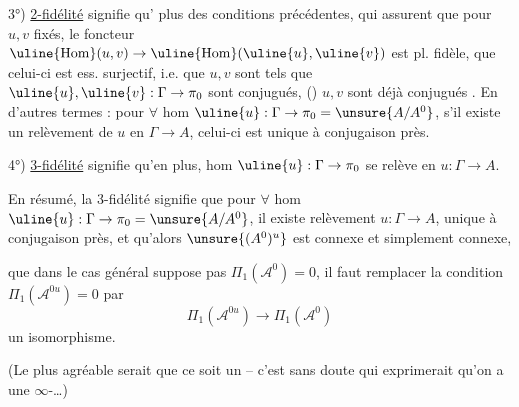 
3°) \uline{2-fidélité} signifie qu' plus des conditions précédentes, qui assurent que pour \(u,v\) fixés, le foncteur \(\uline{\mathrm{Hom}}(u,v)\to\uline{\mathrm{Hom}}(\uline{u},\uline{v})\) est pl. fidèle, que celui-ci est ess. surjectif, i.e. que  \(u,v\) sont tels que \(\uline{u},\uline{v}:\Gamma\to\pi_0\) sont conjugués,  () \(u,v\) sont déjà conjugués . En d'autres termes : pour \(\forall\) hom \(\uline{u}:\Gamma\to\pi_0=\unsure{A/A^0}\), s'il existe un relèvement de \(u\) en \(\Gamma\to A\), celui-ci est unique à conjugaison près.


4°) \uline{3-fidélité} signifie qu'en plus,  hom \(\uline{u}:\Gamma\to\pi_0\) se relève en \(u:\Gamma\to A\).

En résumé,  la 3-fidélité signifie que pour \(\forall\) hom \(\uline{u}:\Gamma\to\pi_0=\unsure{A/A^0}\), il existe  relèvement \(u:\Gamma\to A\), unique à conjugaison près, et qu'alors \(\unsure{(A^0)^u}\) est connexe et simplement connexe,


 que dans le cas général  suppose pas $\Pi_1(\mathcal A^0)=0$, il faut remplacer la condition $\Pi_1(\mathcal A^{0u})=0$ par
\[
\Pi_1(\mathcal A^{0u})\longrightarrow\Pi_1(\mathcal A^0)
\]
un isomorphisme.


(Le plus agréable serait que ce soit un  -- c'est  sans doute qui exprimerait qu'on a une $\infty$-\ldots)

